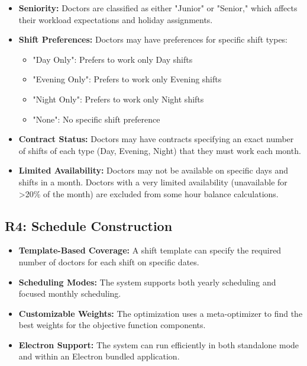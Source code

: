 \documentclass[12pt]{article}
\begin{document}
\begin{itemize}
    \item \textbf{Seniority:} Doctors are classified as either "Junior" or "Senior," which affects their workload expectations and holiday assignments.
    
    \item \textbf{Shift Preferences:} Doctors may have preferences for specific shift types:
    \begin{itemize}
        \item "Day Only": Prefers to work only Day shifts
        \item "Evening Only": Prefers to work only Evening shifts
        \item "Night Only": Prefers to work only Night shifts
        \item "None": No specific shift preference
    \end{itemize}
    
    \item \textbf{Contract Status:} Doctors may have contracts specifying an exact number of shifts of each type (Day, Evening, Night) that they must work each month.
    
    \item \textbf{Limited Availability:} Doctors may not be available on specific days and shifts in a month. Doctors with a very limited availability (unavailable for >20\% of the month) are excluded from some hour balance calculations.
\end{itemize}

\subsection*{R4: Schedule Construction}

\begin{itemize}
    \item \textbf{Template-Based Coverage:} A shift template can specify the required number of doctors for each shift on specific dates.
    
    \item \textbf{Scheduling Modes:} The system supports both yearly scheduling and focused monthly scheduling.
    
    \item \textbf{Customizable Weights:} The optimization uses a meta-optimizer to find the best weights for the objective function components.
    
    \item \textbf{Electron Support:} The system can run efficiently in both standalone mode and within an Electron bundled application.
\end{itemize}
\end{document}
